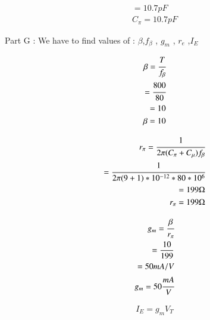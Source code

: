 \begin{enumerate}[label=\thesubsection.\arabic*.,ref=\thesubsection.\theenumi]
\begin{align}
                = 10.7 pF\\
        
        C_{\pi} = 10.7 pF

\end{align}

Part G : We have to find values of :
 $\beta$,$f_{\beta}$ , $g_{m}$ , $r_{e}$ ,$I_{E}$\\ 
  
 
\solution

\begin{align}

        \beta = \cfrac{{T}}{f_{\beta}}\\
             
              = \cfrac{800}{80}\\
              
              = 10\\
        
        \beta = 10

\end{align}
 
 \begin{align}  
        
        r_{\pi} = \cfrac{1}{2\pi(C_{\pi}+C_{\mu})f_{\beta}}\\
    
                = \cfrac{1}{2\pi(9+1)*{10^{-12}}*80*10^6}\\
              
                = 199 \ohm\\
        
        r_{\pi} = 199 \ohm
 
\end{align}

\begin{align}
   
       g_{m} = \cfrac{\beta}{r_{\pi}}\\
            
             = \frac{10}{199}\\
             
             = 50 mA/V\\
        
        g_{m}= 50 \cfrac{mA}{V}
        
\end{align}

\begin{align}        
               
        I_{E} = g_{m}V_{T}\\
              

\end{align}
\end{enumerate}
